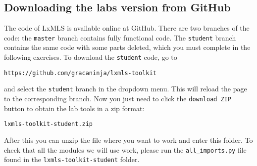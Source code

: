 \subsection{Downloading the labs version from GitHub}

The code of LxMLS is available online at GitHub. There are two branches of the
code: the \verb+master+ branch contains fully functional code. The
\verb+student+ branch contains the same code with some parts deleted, which you
must complete in the following exercises. To download the \verb+student+ code,
go to

\begin{verbatim}
https://github.com/gracaninja/lxmls-toolkit
\end{verbatim}

\noindent and select the \verb+student+ branch in the dropdown menu. This will
reload the page to the corresponding branch. Now you just need to click the
\verb+download ZIP+ button to obtain the lab tools in a zip format:

\begin{verbatim}
lxmls-toolkit-student.zip
\end{verbatim}

After this you can unzip the file where you want to work and enter this folder.
To check that all the modules we will use work, please run the
\verb+all_imports.py+ file found in the \verb+lxmls-toolkit-student+ folder.
